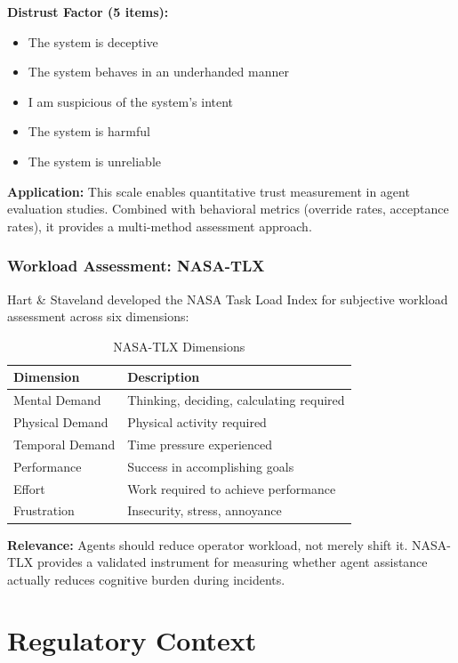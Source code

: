 \textbf{Distrust Factor (5 items):}
\begin{itemize}
    \item The system is deceptive
    \item The system behaves in an underhanded manner
    \item I am suspicious of the system's intent
    \item The system is harmful
    \item The system is unreliable
\end{itemize}

\textbf{Application:} This scale enables quantitative trust measurement in agent evaluation studies. Combined with behavioral metrics (override rates, acceptance rates), it provides a multi-method assessment approach.

\subsubsection{Workload Assessment: NASA-TLX}

Hart \& Staveland \citep{hart1988} developed the NASA Task Load Index for subjective workload assessment across six dimensions:

\begin{table}[htbp]
\centering
\caption{NASA-TLX Dimensions}
\label{tab:nasa-tlx}
\begin{tabular}{ll}
\toprule
\textbf{Dimension} & \textbf{Description} \\
\midrule
Mental Demand & Thinking, deciding, calculating required \\
Physical Demand & Physical activity required \\
Temporal Demand & Time pressure experienced \\
Performance & Success in accomplishing goals \\
Effort & Work required to achieve performance \\
Frustration & Insecurity, stress, annoyance \\
\bottomrule
\end{tabular}
\end{table}

\textbf{Relevance:} Agents should reduce operator workload, not merely shift it. NASA-TLX provides a validated instrument for measuring whether agent assistance actually reduces cognitive burden during incidents.

\section{Regulatory Context}
\label{sec:regulatory-context}

